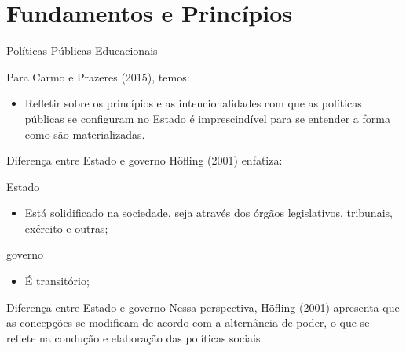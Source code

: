 \documentclass[12pt]{beamer}
\begin{document}
	\section{Fundamentos e Princípios}
		\begin{frame}{Políticas Públicas Educacionais}
			\begin{block}{Para Carmo e Prazeres (2015), temos:}
				\begin{itemize}
					\item Refletir sobre os princípios e as intencionalidades com que as políticas públicas se configuram no Estado é imprescindível para se entender a forma
					como são materializadas.
					
				\end{itemize}
			\end{block}
		\end{frame}
		
		\begin{frame}{Diferença entre Estado e governo}
			Höfling (2001) enfatiza:
			\begin{block}{Estado}
				\begin{itemize}
					\item Está solidificado na sociedade, seja através dos órgãos legislativos, tribunais, exército e outras;
					
				\end{itemize}
			\end{block}
			
			\begin{block}{governo}
				\begin{itemize}
					\item É transitório;
					
				\end{itemize}
			\end{block}
		\end{frame}
		
			\begin{frame}{Diferença entre Estado e governo}
				\justifying
				Nessa perspectiva, Höfling (2001) apresenta que as concepções
				se modificam de acordo com a alternância de poder, o que se reflete na condução e elaboração das políticas sociais. \\
			\end{frame}
	
\end{document}

